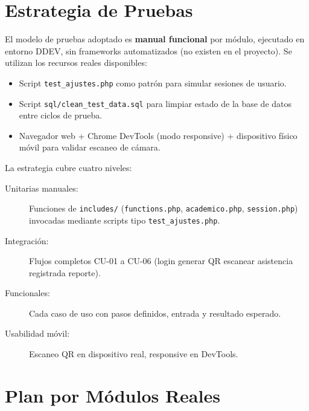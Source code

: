 \documentclass[12pt, letterpaper, oneside]{report}
\begin{document}
\section{Estrategia de Pruebas}

El modelo de pruebas adoptado es \textbf{manual funcional} por m\'odulo, ejecutado en entorno DDEV, sin frameworks automatizados (no existen en el proyecto). Se utilizan los recursos reales disponibles:

\begin{itemize}
  \item Script \texttt{test\_ajustes.php} como patr\'on para simular sesiones de usuario.
  \item Script \texttt{sql/clean\_test\_data.sql} para limpiar estado de la base de datos entre ciclos de prueba.
  \item Navegador web + Chrome DevTools (modo responsive) + dispositivo f\'isico m\'ovil para validar escaneo de c\'amara.
\end{itemize}

La estrategia cubre cuatro niveles:

\begin{description}
  \item[Unitarias manuales:] Funciones de \texttt{includes/} (\texttt{functions.php}, \texttt{academico.php}, \texttt{session.php}) invocadas mediante scripts tipo \texttt{test\_ajustes.php}.
  \item[Integraci\'on:] Flujos completos CU-01 a CU-06 (login \textrightarrow generar QR \textrightarrow escanear \textrightarrow asistencia registrada \textrightarrow reporte).
  \item[Funcionales:] Cada caso de uso con pasos definidos, entrada y resultado esperado.
  \item[Usabilidad m\'ovil:] Escaneo QR en dispositivo real, responsive en DevTools.
\end{description}

\section{Plan por Módulos Reales}
\end{document}

